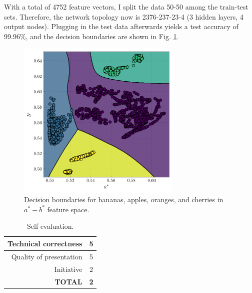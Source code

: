\documentclass[12pt,a4paper]{article}
\begin{document}
With a total of 4752 feature vectors, I split the data 50-50 among the train-test sets. Therefore, the network topology now is 2376-237-23-4 (3 hidden layers, 4 output nodes). Plugging in the test data afterwards yields a test accuracy of 99.96\%, and the decision boundaries are shown in Fig. \ref{fig:multiple-fruits}.

\begin{figure}[htb]
	\centering
	\includegraphics[width=0.7\textwidth]{multiple-decision.png}
	\caption{Decision boundaries for bananas, apples, oranges, and cherries in $a^*-b^*$ feature space.}
	\label{fig:multiple-fruits}
\end{figure}

\clearpage
\begin{table}[!htb]
	\centering
	\caption{Self-evaluation.}
	\begin{tabular}{||r|c||}
		\hline
		Technical correctness & 5 \\ \hline
		Quality of presentation & 5 \\ \hline
		Initiative & 2 \\ \hline
		\textbf{TOTAL} & \textbf{2} \\ \hline
	\end{tabular}
	\label{tab:self-eval}
\end{table}



\end{document}
